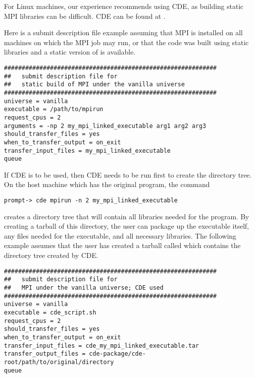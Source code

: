 For Linux machines, our experience recommends using CDE,
as building static MPI libraries can be difficult.
CDE can be found at .

Here is a submit description file example assuming that
MPI is installed on all machines on which the MPI job
may run, 
or that the code was built using static libraries and a static version of 
 is available.

\footnotesize
\begin{verbatim}
############################################################
##   submit description file for 
##   static build of MPI under the vanilla universe
############################################################
universe = vanilla
executable = /path/to/mpirun
request_cpus = 2
arguments = -np 2 my_mpi_linked_executable arg1 arg2 arg3
should_transfer_files = yes
when_to_transfer_output = on_exit
transfer_input_files = my_mpi_linked_executable
queue
\end{verbatim}
\normalsize

If CDE is to be used,
then CDE needs to be run first to create the directory tree. 
On the host machine which has the original program, the command

\footnotesize
\begin{verbatim}
prompt-> cde mpirun -n 2 my_mpi_linked_executable
\end{verbatim}
\normalsize

creates a directory tree that will contain all libraries needed for the 
program.
By creating a tarball of this directory, the user can package up
the executable itself, 
any files needed for the executable, 
and all necessary libraries. 
The following example assumes that the user has created a 
tarball called  which contains the 
directory tree created by CDE.

\footnotesize
\begin{verbatim}
############################################################
##   submit description file for 
##   MPI under the vanilla universe; CDE used
############################################################
universe = vanilla
executable = cde_script.sh
request_cpus = 2
should_transfer_files = yes
when_to_transfer_output = on_exit
transfer_input_files = cde_my_mpi_linked_executable.tar
transfer_output_files = cde-package/cde-root/path/to/original/directory
queue
\end{verbatim}
\normalsize

